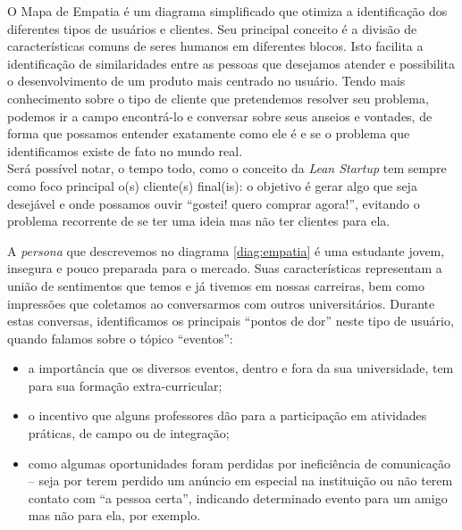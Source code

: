 \documentclass[12pt,a4paper,twoside,hyphens,english,brazil]{abntex2}
\newcommand{\conf}{{\color{OliveGreen}\framebox[1.1\width]{CNF}}}
\begin{document}
O Mapa de Empatia\cite{mapa-de-empatia} é um diagrama simplificado que otimiza a identificação dos diferentes tipos de usuários e clientes. Seu principal conceito é a divisão de características comuns de seres humanos em diferentes blocos. Isto facilita a identificação de similaridades entre as pessoas que desejamos atender e possibilita o desenvolvimento de um produto mais centrado no usuário. Tendo mais conhecimento sobre o tipo de cliente que pretendemos resolver seu problema, podemos ir a campo encontrá-lo e conversar sobre seus anseios e vontades, de forma que possamos entender exatamente como ele é e se o problema que identificamos existe de fato no mundo real.\\

Será possível notar, o tempo todo, como o conceito da \emph{Lean Startup} tem sempre como foco principal o(s) cliente(s) final(is): o objetivo é gerar algo que seja desejável e onde possamos ouvir ``gostei! quero comprar agora!'', evitando o problema recorrente de se ter uma ideia mas não ter clientes para ela.

A \emph{persona}\footnotemark{} que descrevemos no diagrama \ref{diag:empatia} é uma estudante jovem, insegura e pouco preparada para o mercado. Suas características representam a união de sentimentos que temos e já tivemos em nossas carreiras, bem como impressões que coletamos ao conversarmos com outros universitários. Durante estas conversas, identificamos os principais ``pontos de dor'' neste tipo de usuário, quando falamos sobre o tópico ``eventos'':

\begin{itemize}[itemsep=-1ex]
	\item  a importância que os diversos eventos, dentro e fora da sua universidade, tem para sua formação extra-curricular;
	\item  o incentivo que alguns professores dão para a participação em atividades práticas, de campo ou de integração;
	\item  como algumas oportunidades foram perdidas por ineficiência de comunicação -- seja por terem perdido um anúncio em especial na instituição ou não terem contato com ``a pessoa certa'', indicando determinado evento para um amigo mas não para ela, por exemplo.
\end{itemize}

\end{document}
